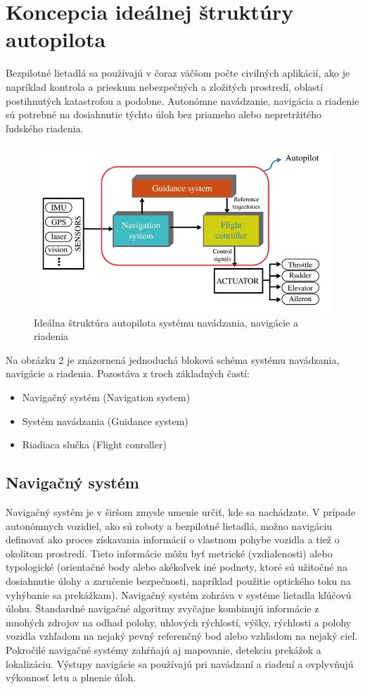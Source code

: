 \documentclass[10pt,twoside,slovak,a4paper]{article}
\begin{document}
\section{Koncepcia ideálnej štruktúry autopilota}
Bezpilotné lietadlá sa používajú v čoraz väčšom počte civilných aplikácií, ako je napríklad kontrola a prieskum 
nebezpečných a zložitých prostredí, oblastí postihnutých katastrofou a podobne. Autonómne 
navádzanie, navigácia a riadenie sú potrebné na dosiahnutie týchto úloh bez priameho alebo 
nepretržitého ľudského riadenia.  \cite{nonami2010autonomous} 
	\begin{figure}[h]
	\includegraphics[width=\linewidth]{model.png}
	\caption{Ideálna štruktúra autopilota systému navádzania, navigácie a riadenia \cite{nonami2010autonomous}}
	\label{fig:model1}
	\end{figure}

Na obrázku 2 je znázornená jednoduchá bloková schéma systému navádzania, navigácie a riadenia.
Pozostáva z troch základných častí:
\begin{itemize}
\item Navigačný systém (Navigation system)
\item Systém navádzania (Guidance system)
\item Riadiaca slučka (Flight conroller)
\end{itemize} 

\subsection{Navigačný systém}
Navigačný systém je v širšom zmysle umenie určiť, kde sa nachádzate. V prípade autonómnych vozidiel, ako sú roboty a bezpilotné lietadlá, možno navigáciu definovať ako proces získavania informácií o vlastnom pohybe vozidla a tiež o okolitom prostredí. Tieto informácie môžu byť metrické (vzdialenosti) alebo typologické (orientačné body alebo akékoľvek iné podnety, ktoré sú užitočné na dosiahnutie úlohy a zaručenie bezpečnosti, napríklad použitie optického toku na vyhýbanie sa prekážkam). Navigačný systém zohráva v systéme lietadla kľúčovú úlohu. Štandardné navigačné algoritmy zvyčajne kombinujú informácie z mnohých zdrojov na odhad polohy, uhlových rýchlostí, výšky, rýchlosti a polohy vozidla vzhľadom na nejaký pevný referenčný bod alebo vzhľadom na nejaký cieľ. Pokročilé navigačné systémy zahŕňajú aj mapovanie, detekciu prekážok a lokalizáciu. Výstupy navigácie sa používajú pri navádzaní a riadení a ovplyvňujú výkonnosť letu a plnenie úloh. \cite{nonami2020present} \cite{nonami2010autonomous}
\end{document}
